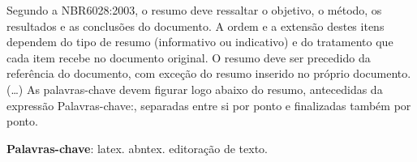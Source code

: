 %

\setlength{\absparsep}{18pt} %
\begin{resumo}
	Segundo a NBR6028:2003, o resumo deve ressaltar o
	objetivo, o método, os resultados e as conclusões do documento. A ordem e a extensão
	destes itens dependem do tipo de resumo (informativo ou indicativo) e do
	tratamento que cada item recebe no documento original. O resumo deve ser
	precedido da referência do documento, com exceção do resumo inserido no
	próprio documento. (\ldots) As palavras-chave devem figurar logo abaixo do
	resumo, antecedidas da expressão Palavras-chave:, separadas entre si por
	ponto e finalizadas também por ponto.
	
	\textbf{Palavras-chave}: latex. abntex. editoração de texto.
\end{resumo}
